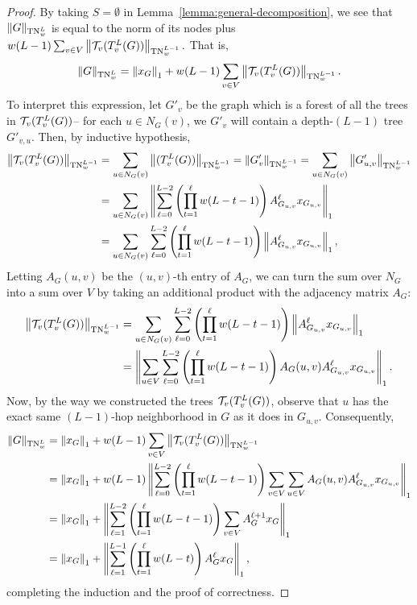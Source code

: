 \begin{proof}
By taking $S = \emptyset$ in Lemma~\ref{lemma:general-decomposition}, we see that $\Vert G \Vert_{\textnormal{TN}_w^L}$ is equal to the norm of its nodes plus $w(L-1)\sum_{v \in V}\left\lVert{\mathcal T_v(T_v^L(G))}\right\rVert_{\text{TN}_{w}^{L-1}}.$ That is, 
\begin{align*}
    \Vert G \Vert_{\textnormal{TN}_w^L} = \left\lVert x_G\right\rVert_1 + w(L-1) \sum_{v \in V} \left\lVert{\mathcal T_v(T_v^L(G))}\right\rVert_{\text{TN}_{w}^{L-1}}. 
\end{align*}
To interpret this expression, let $G'_v$ be the graph which is a forest of all the trees in ${\mathcal T_v(T_v^L(G))}$-- for each $u \in N_G(v)$, we $G'_v$ will contain a depth-$(L-1)$ tree $G'_{v, u}$. Then, by inductive hypothesis,
\begin{align*}
    \left\lVert{\mathcal T_v(T_v^L(G))}\right\rVert_{\text{TN}_{w}^{L-1}} &= \sum_{u \in N_G(v)} \left\lVert{(T_v^L(G))}\right\rVert_{\text{TN}_{w}^{L-1}} = \left\lVert G'_v\right\rVert_{\text{TN}_w^{L-1}} = \sum_{u \in N_G(v)} \left\lVert G'_{u,v}\right\rVert_{\text{TN}_w^{L-1}} \\
    &= \sum_{u \in N_G(v)} \left\lVert\sum_{\ell=0}^{L-2} \left(\prod_{t=1}^\ell w(L-t-1) \right ) A_{G_{u,v}}^{\ell} x_{G_{u,v}}\right\rVert_1 \\
    &=  \sum_{u \in N_G(v)} \sum_{\ell=0}^{L-2} \left(\prod_{t=1}^\ell w(L-t-1) \right ) \left\lVert A_{G_{u,v}}^{\ell} x_{G_{u,v}}\right\rVert_1,  
\end{align*}
Letting $A_G(u, v)$ be the $(u, v)$-th entry of $A_G$, we can turn the sum over $N_G$ into a sum over $V$ by taking an additional product with the adjacency matrix $A_G$: 
\begin{align*}
    \left\lVert{\mathcal T_v(T_v^L(G))}\right\rVert_{\text{TN}_{w}^{L-1}} &= \sum_{u \in N_G(v)} \sum_{\ell=0}^{L-2} \left(\prod_{t=1}^\ell w(L-t-1) \right ) \left\lVert A_{G_{u,v}}^{\ell} x_{G_{u,v}}\right\rVert_1 \\
    &= \left\lVert \sum_{u \in V} \sum_{\ell=0}^{L-2} \left(\prod_{t=1}^\ell w(L-t-1) \right ) A_G(u, v) A_{G_{u,v}}^{\ell} x_{G_{u,v}}\right\rVert_1. 
\end{align*}
Now, by the way we constructed the trees ${\mathcal T_v(T_v^L(G))}$, observe that $u$ has the exact same $(L-1)$-hop neighborhood in $G$ as it does in $G_{u,v}$. Consequently,
\begin{align*}
    \Vert G \Vert_{\textnormal{TN}_w^L} &= \left\lVert x_G\right\rVert_1 + w(L-1) \sum_{v \in V} \left\lVert{\mathcal T_v(T_v^L(G))}\right\rVert_{\text{TN}_{w}^{L-1}} \\
    &= \left\lVert x_G\right\rVert_1 + w(L-1) \left\lVert  \sum_{\ell=0}^{L-2} \left(\prod_{t=1}^\ell w(L-t-1) \right ) \sum_{v \in V} \sum_{u \in V} A_G(u, v) A_{G_{u,v}}^{\ell} x_{G_{u,v}}\right\rVert_1 \\
    &= \left\lVert x_G\right\rVert_1 + \left\lVert\sum_{\ell=1}^{L-2}  \left(\prod_{t=1}^\ell w(L-t-1) \right ) \sum_{v \in V}A_G^{\ell+1} {x}_{G}\right\rVert_1 \\
    &= \left\lVert x_G\right\rVert_1 + \left\lVert\sum_{\ell=1}^{L-1} \left(\prod_{t=1}^{\ell} w(L-t) \right ) A_G^{\ell} {x}_{G}\right\rVert_1, 
\end{align*}
completing the induction and the proof of correctness. 
\end{proof}


